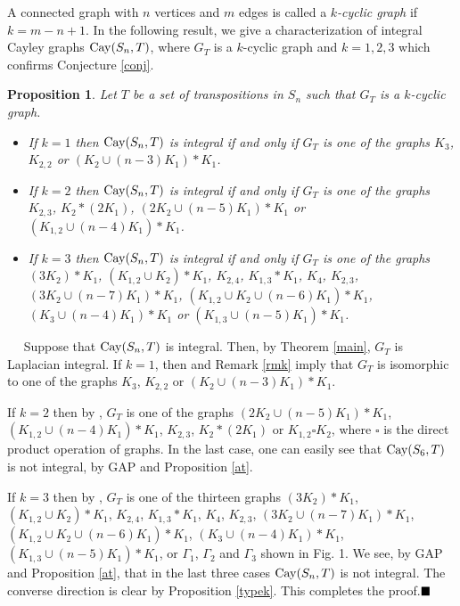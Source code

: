 \documentclass[12pt,a4paper]{article}
\newtheorem{proposition}{\bf Proposition}
\renewcommand{\proof}{\noindent{\it\textbf{Proof.}}\ \ }
\newcommand{\Cay}{{\rm Cay}}
\newcommand{\eqd}{$\hfill \blacksquare$}
\begin{document}
A connected graph with $n$ vertices and $m$ edges is called a \textit{$k$-cyclic graph} if $k=m-n+1$. In the following result, we give a characterization of integral Cayley graphs $\Cay(S_n,T)$, where $G_T$ is a $k$-cyclic graph and $k=1,2,3$ which confirms Conjecture \ref{conj}.

\begin{proposition}\label{prop3}
Let $T$ be a set of transpositions in $S_n$ such that $G_T$ is a $k$-cyclic graph.
\begin{itemize}
\item[(a)] If $k=1$ then $\Cay(S_n,T)$ is integral if and only if  $G_T$ is one of the graphs $K_3$, $K_{2,2}$ or $(K_2\cup (n-3)K_1)*K_1$.
\item[(b)] If $k=2$ then $\Cay(S_n,T)$ is integral if and only if $G_T$ is one of the graphs $K_{2,3}$, $K_2*(2K_1)$, $(2K_2\cup (n-5)K_1)*K_1$ or $(K_{1,2}\cup (n-4)K_1)*K_1$.
\item[(c)] If $k=3$ then $\Cay(S_n,T)$ is integral if and only if $G_T$ is one of the graphs $(3K_2)*K_1$, $(K_{1,2}\cup K_2)*K_1$, $K_{2,4}$, $K_{1,3}*K_1$, $K_4$, $K_{2,3}$, $(3K_2\cup (n-7)K_1)*K_1$, $(K_{1,2}\cup K_2\cup (n-6)K_1)*K_1$, $(K_3\cup (n-4)K_1)*K_1$ or $(K_{1,3}\cup (n-5)K_1)*K_1$.
\end{itemize}
\end{proposition}
\proof
 Suppose that $\Cay(S_n,T)$ is integral. Then, by Theorem \ref{main}, $G_T$ is Laplacian integral. If $k=1$, then \cite[Theorem 3.2]{LL} and Remark \ref{rmk} imply that $G_T$ is isomorphic to one of the graphs  $K_3$, $K_{2,2}$ or $(K_2\cup (n-3)K_1)*K_1$.

If $k=2$ then by \cite[Theorem 3.3]{LL}, $G_T$ is one of the graphs $(2K_2\cup (n-5)K_1)*K_1$, $(K_{1,2}\cup (n-4)K_1)*K_1$, $K_{2,3}$, $K_2*(2K_1)$ or $K_{1,2}\square K_2$, where $\square$ is the direct product operation of graphs. In the last case, one can easily see that $\Cay(S_6,T)$ is not integral, by GAP \cite{GAP2022} and Proposition \ref{at}.

If $k=3$ then by \cite[Theorem 4.1 and Theorem 5.1]{HHW}, $G_T$ is one of the thirteen graphs $(3K_2)*K_1$, $(K_{1,2}\cup K_2)*K_1$, $K_{2,4}$, $K_{1,3}*K_1$, $K_4$, $K_{2,3}$, $(3K_2\cup (n-7)K_1)*K_1$, $(K_{1,2}\cup K_2\cup (n-6)K_1)*K_1$, $(K_3\cup (n-4)K_1)*K_1$, $(K_{1,3}\cup (n-5)K_1)*K_1$, or $\Gamma_1$, $\Gamma_2$ and $\Gamma_3$ shown in Fig. 1. We see, by GAP \cite{GAP2022} and Proposition \ref{at}, that in the last three cases $\Cay(S_n,T)$ is not integral. The converse direction is clear by Proposition \ref{typek}. This completes the proof.\eqd
\end{document}
